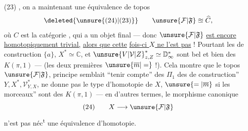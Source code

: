\noindent (23)
,
on a maintenant une équivalence de topos
\[
\deleted{\unsure{(24)|(23)}}\qquad \unsure{\mathcal F|\mathfrak F}\approxeq\widehat C,
\]
où $C$ est la catégorie \diagram{\begin{tikzcd}[column sep=small]\bullet\arrow[r]&\bullet\end{tikzcd}}, qui a
un objet final --- donc $\unsure{\mathcal F|\mathfrak F}$ \uline{est encore}
\uline{homotopiquement trivial,} \uline{alors que cette}
\uline{fois-ci $X$ ne l'est pas} ! Pourtant les
 de construction $\{a\}$, $X^*\simeq\mathbb C$, et
${\unsure{V|\mathcal V|Z}}^*_{z,Z}\simeq\mathbb D^*_{\infty}$ sont bel et bien des $K(\pi,1)$ ---
(les deux premières $\unsure{\overline m|=}$  !). Cela
montre que le topos $\unsure{\mathcal F|\mathfrak F}$, 
principe semblait ``tenir compte'' des
$\Pi_1$ des  de construction'' $Y,X^*,\mathcal V^*_{Y,X}$,
ne donne pas  le type d'homotopie
de $X$, $\unsure{=|\overline m}$ si les morceaux'' sont des
$K(\pi,1)$ --- en d'autres termes, le
morphisme canonique
\[
(24)\qquad X\longrightarrow\unsure{\mathcal F|\mathfrak F}
\]
n'est pas néc\textsuperscript{t} une équivalence d'homotopie.
